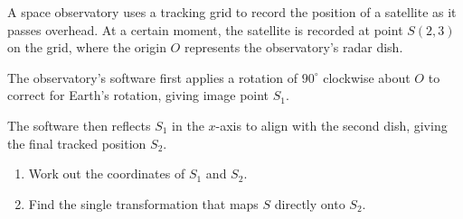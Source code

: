 \begin{question}
\noindent A space observatory uses a tracking grid to record the position of a satellite as it passes overhead. At a certain moment, the satellite is recorded at point $S(2,3)$ on the grid, where the origin $O$ represents the observatory's radar dish.

\begin{center}
\end{center}

\noindent The observatory's software first applies a rotation of $90^\circ$ clockwise about $O$ to correct for Earth's rotation, giving image point $S_1$.

\noindent The software then reflects $S_1$ in the $x$-axis to align with the second dish, giving the final tracked position $S_2$.

\begin{enumerate}
    \item[(a)] Work out the coordinates of $S_1$ and $S_2$.

    \vspace{4cm}

    \item[(b)] Find the single transformation that maps $S$ directly onto $S_2$.

    \vspace{3cm}
\end{enumerate}
\end{question}
